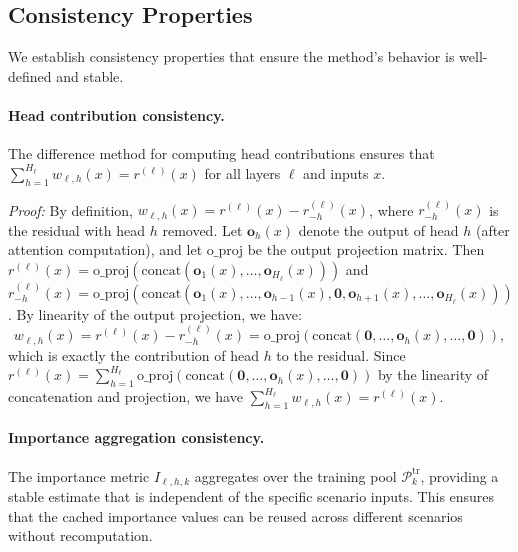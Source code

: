 \subsection{Consistency Properties}
\label{app:math_consistency}

We establish consistency properties that ensure the method's behavior is well-defined and stable.

\paragraph{Head contribution consistency.}
The difference method for computing head contributions ensures that $\sum_{h=1}^{H_\ell} w_{\ell,h}(x) = r^{(\ell)}(x)$ for all layers $\ell$ and inputs $x$.

\emph{Proof:} By definition, $w_{\ell,h}(x) = r^{(\ell)}(x) - r^{(\ell)}_{-h}(x)$, where $r^{(\ell)}_{-h}(x)$ is the residual with head $h$ removed.
Let $\mathbf{o}_h(x)$ denote the output of head $h$ (after attention computation), and let $\text{o\_proj}$ be the output projection matrix.
Then $r^{(\ell)}(x) = \text{o\_proj}(\text{concat}(\mathbf{o}_1(x), \ldots, \mathbf{o}_{H_\ell}(x)))$ and $r^{(\ell)}_{-h}(x) = \text{o\_proj}(\text{concat}(\mathbf{o}_1(x), \ldots, \mathbf{o}_{h-1}(x), \mathbf{0}, \mathbf{o}_{h+1}(x), \ldots, \mathbf{o}_{H_\ell}(x)))$.
By linearity of the output projection, we have:
\begin{equation}
w_{\ell,h}(x) = r^{(\ell)}(x) - r^{(\ell)}_{-h}(x) = \text{o\_proj}(\text{concat}(\mathbf{0}, \ldots, \mathbf{o}_h(x), \ldots, \mathbf{0})),
\end{equation}
which is exactly the contribution of head $h$ to the residual.
Since $r^{(\ell)}(x) = \sum_{h=1}^{H_\ell} \text{o\_proj}(\text{concat}(\mathbf{0}, \ldots, \mathbf{o}_h(x), \ldots, \mathbf{0}))$ by the linearity of concatenation and projection, we have $\sum_{h=1}^{H_\ell} w_{\ell,h}(x) = r^{(\ell)}(x)$.

\paragraph{Importance aggregation consistency.}
The importance metric $I_{\ell,h,k}$ aggregates over the training pool $\mathcal{P}_k^{\mathrm{tr}}$, providing a stable estimate that is independent of the specific scenario inputs.
This ensures that the cached importance values can be reused across different scenarios without recomputation.



